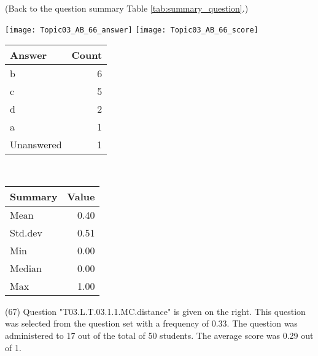 \documentclass[12pt,english,nohyper]{tufte-handout}\usepackage[]{graphicx}\usepackage[]{color}
\begin{document}
 (Back to the question summary Table \ref{tab:summary_question}.)

\begin{center} \texttt{[image: Topic03\_AB\_66\_answer]} \texttt{[image: Topic03\_AB\_66\_score]} \end{center} 

\begin{center}%
\begin{tabular}{lr}
  \hline
Answer & Count \\ 
  \hline
b &   6 \\ 
  c &   5 \\ 
  d &   2 \\ 
  a &   1 \\ 
  Unanswered &   1 \\ 
   \hline
\end{tabular}
~~~~~~~~%
\begin{tabular}{lr}
  \hline
Summary & Value \\ 
  \hline
Mean & 0.40 \\ 
  Std.dev & 0.51 \\ 
  Min & 0.00 \\ 
  Median & 0.00 \\ 
  Max & 1.00 \\ 
   \hline
\end{tabular}
\end{center}\newpage{} (67) Question "T03.L.T.03.1.1.MC.distance" is given on the right. This question was selected from the question set with a frequency of 0.33. The question was administered to 17 out of the total of 50 students. The average score was 0.29 out of 1.
\end{document}
